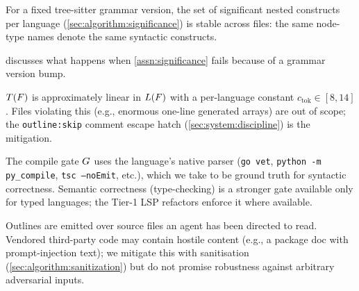 \begin{assumption}
\label{assn:significance}
For a fixed tree-sitter grammar version, the set of significant nested
constructs per language (\cref{sec:algorithm:significance}) is stable
across files: the same node-type names denote the same syntactic
constructs.
\end{assumption}

 discusses what happens when
\cref{assn:significance} fails because of a grammar version bump.

\begin{assumption}
\label{assn:tokens}
$T(F)$ is approximately linear in $L(F)$ with a
per-language constant $c_\text{tok} \in [8, 14]$. Files violating this
(e.g., enormous one-line generated arrays) are out of scope; the
\texttt{outline:skip} comment escape hatch
(\cref{sec:system:discipline}) is the mitigation.
\end{assumption}

\begin{assumption}
\label{assn:gate}
The compile gate $G$ uses the language's native parser
(\texttt{go vet}, \texttt{python -m py\_compile}, \texttt{tsc
--noEmit}, etc.), which we take to be ground truth for syntactic
correctness. Semantic correctness (type-checking) is a stronger gate
available only for typed languages; the Tier-1 LSP refactors enforce
it where available.
\end{assumption}

\begin{assumption}
\label{assn:adversarial}
Outlines are emitted over source files an agent has been directed to
read. Vendored third-party code may contain hostile content (e.g., a
package doc with prompt-injection text); we mitigate this with
sanitisation (\cref{sec:algorithm:sanitization}) but do not promise
robustness against arbitrary adversarial inputs.
\end{assumption}
